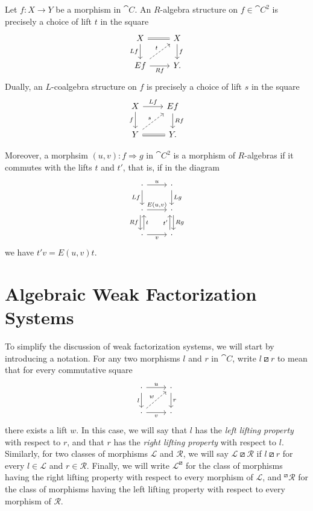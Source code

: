 \begin{lemma}
	Let $f\colon X\to Y$ be a morphism in $\cat{C}$. An $R$-algebra structure on $f\in\cat{C}^2$ is precisely a choice of lift $t$ in the square
	\begin{equation}\label{Eq:RAlg}
	\begin{tikzcd}
		X \rar[equals] \dar[swap]{Lf} & X \dar{f} \\
		Ef \rar[swap]{Rf} \urar[dashed]{t} & Y.
	\end{tikzcd}
	\end{equation}
	Dually, an $L$-coalgebra structure on $f$ is precisely a choice of lift $s$ in the square
	\begin{equation}\label{Eq:LAlg}
	\begin{tikzcd}
		X \rar{Lf} \dar[swap]{f} & Ef \dar{Rf} \\
		Y \rar[equals] \urar[dashed]{s} & Y.
	\end{tikzcd}
	\end{equation}

	Moreover, a morphsim $(u,v)\colon f\Rightarrow g$ in $\cat{C}^2$ is a morphism of $R$-algebras if it commutes with the lifts $t$ and $t'$, that is, if in the diagram
	\[
	\begin{tikzcd}
		\cdot 	\rar{u} 
				\dar[swap]{Lf} 
			& \cdot \dar{Lg} \\
		\cdot 	\rar{E(u,v)} 
				\dar[xshift=-0.5ex][swap]{Rf} 
			& \cdot 
				\dar[xshift=0.5ex]{Rg} \\
		\cdot 	\uar[xshift=0.5ex][swap]{t}
				\rar[swap]{v}
			& \cdot \uar[xshift=-0.5ex]{t'}
	\end{tikzcd}
	\]
	we have $t'v=E(u,v)t$.
\end{lemma}

\section{Algebraic Weak Factorization Systems}

To simplify the discussion of weak factorization systems, we will start by introducing a notation. For any two morphisms $l$ and $r$ in $\cat{C}$, write $l\boxslash r$ to mean that for every commutative square
\begin{equation}\label{Eq:LiftingSquare}
\begin{tikzcd}
	\cdot \rar{u} \dar[swap]{l} & \cdot \dar{r} \\
	\cdot \rar[swap]{v} \urar[dashed]{w} & \cdot
\end{tikzcd}
\end{equation}
there exists a lift $w$. In this case, we will say that $l$ has the \emph{left lifting property} with respect to $r$, and that $r$ has the \emph{right lifting property} with respect to $l$. Similarly, for two classes of morphisms $\mathcal{L}$ and $\mathcal{R}$, we will say $\mathcal{L}\boxslash\mathcal{R}$ if $l\boxslash r$ for every $l\in\mathcal{L}$ and $r\in\mathcal{R}$. Finally, we will write $\mathcal{L}^{\boxslash}$ for the class of morphisms having the right lifting property with respect to every morphism of $\mathcal{L}$, and ${}^{\boxslash}\!\mathcal{R}$ for the class of morphisms having the left lifting property with respect to every morphism of $\mathcal{R}$.

